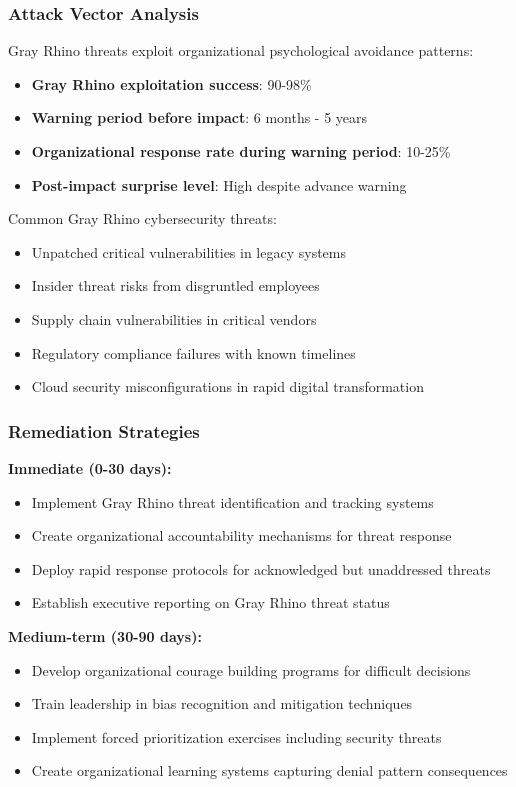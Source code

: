 \documentclass[11pt,a4paper]{article}
\begin{document}
\subsubsection{Attack Vector Analysis}

Gray Rhino threats exploit organizational psychological avoidance patterns:

\begin{itemize}
\item \textbf{Gray Rhino exploitation success}: 90-98\%
\item \textbf{Warning period before impact}: 6 months - 5 years
\item \textbf{Organizational response rate during warning period}: 10-25\%
\item \textbf{Post-impact surprise level}: High despite advance warning
\end{itemize}

Common Gray Rhino cybersecurity threats:
\begin{itemize}
\item Unpatched critical vulnerabilities in legacy systems
\item Insider threat risks from disgruntled employees
\item Supply chain vulnerabilities in critical vendors
\item Regulatory compliance failures with known timelines
\item Cloud security misconfigurations in rapid digital transformation
\end{itemize}

\subsubsection{Remediation Strategies}

\textbf{Immediate (0-30 days):}
\begin{itemize}
\item Implement Gray Rhino threat identification and tracking systems
\item Create organizational accountability mechanisms for threat response
\item Deploy rapid response protocols for acknowledged but unaddressed threats
\item Establish executive reporting on Gray Rhino threat status
\end{itemize}

\textbf{Medium-term (30-90 days):}
\begin{itemize}
\item Develop organizational courage building programs for difficult decisions
\item Train leadership in bias recognition and mitigation techniques
\item Implement forced prioritization exercises including security threats
\item Create organizational learning systems capturing denial pattern consequences
\end{itemize}
\end{document}
